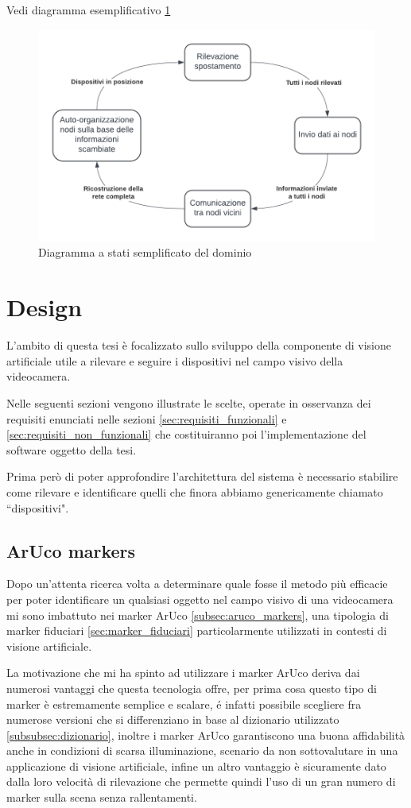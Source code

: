 \documentclass[12pt,a4paper,openright,twoside]{book}
\begin{document}
Vedi diagramma esemplificativo \ref{fig:domain_diagram}
\begin{figure}[h!]
	\centering
	\includegraphics[width=0.8\linewidth]{./figures/UML/domainDiagram.png}
	\caption{Diagramma a stati semplificato del dominio}
	\label{fig:domain_diagram}
\end{figure}
\chapter{Design}
L'ambito di questa tesi è focalizzato sullo sviluppo della componente di visione artificiale utile a rilevare e seguire i dispositivi nel campo visivo della videocamera.

Nelle seguenti sezioni vengono illustrate le scelte, operate in osservanza dei requisiti enunciati nelle sezioni \ref{sec:requisiti_funzionali} e \ref{sec:requisiti_non_funzionali} che costituiranno poi l'implementazione del software oggetto della tesi.

Prima però di poter approfondire l'architettura del sistema è necessario stabilire come rilevare e identificare quelli che finora abbiamo genericamente chiamato ``dispositivi".

\section{ArUco markers}
Dopo un'attenta ricerca volta a determinare quale fosse il metodo più efficacie per poter identificare un qualsiasi oggetto nel campo visivo di una videocamera mi sono imbattuto nei marker ArUco \ref{subsec:aruco_markers}, una tipologia di marker fiduciari \ref{sec:marker_fiduciari} particolarmente utilizzati in contesti di visione artificiale.

La motivazione che mi ha spinto ad utilizzare i marker ArUco deriva dai numerosi vantaggi che questa tecnologia offre, per prima cosa questo tipo di marker è estremamente semplice e scalare, é infatti possibile scegliere fra numerose versioni che si differenziano in base al dizionario utilizzato \ref{subsubsec:dizionario}, inoltre i marker ArUco garantiscono una buona affidabilità anche in condizioni di scarsa illuminazione, scenario da non sottovalutare in una applicazione di visione artificiale, infine un altro vantaggio è sicuramente dato dalla loro velocità di rilevazione che permette quindi l'uso di un gran numero di marker sulla scena senza rallentamenti.
\end{document}
